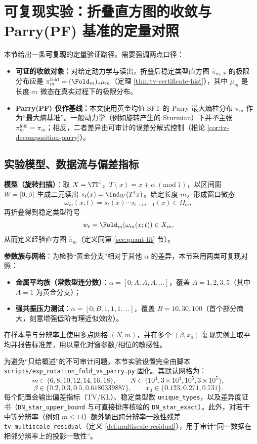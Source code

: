 \section{可复现实验：折叠直方图的收敛与 Parry(PF) 基准的定量对照}\label{sec:experiments}

本节给出一条\textbf{可复现}的定量验证路径。需要强调两点口径：
\begin{itemize}
  \item \textbf{可证的收敛对象：}对给定动力学与读出，折叠后稳定类型直方图 $\hat{\pi}_{m,N}$ 的极限分布应是 $\pi_m^{\mathrm{fold}}=(\Fold_m)_*\mu_m$（定理 \ref{thm:tv-certificate-hist}），其中 $\mu_m$ 是长度-$m$ 微态在真实过程下的极限分布。
  \item \textbf{Parry(PF) 仅作基线：}本文使用黄金均值 SFT 的 Parry 最大熵柱分布 $\pi_m$ 作为“最大熵基准”。一般动力学（例如旋转产生的 Sturmian）下并\emph{不}主张 $\pi_m^{\mathrm{fold}}=\pi_m$；相反，二者差异由可审计的误差分解式控制（推论 \ref{cor:tv-decomposition-parry}）。
\end{itemize}

\subsection{实验模型、数据流与偏差指标}

\textbf{模型（旋转扫描）}：取 $X=\TT^1$，$T(x)=x+\alpha\ (\mathrm{mod}\ 1)$，以区间窗 $W=[0,\beta)$ 生成二元读出 $s_t(x)=\ind_W(T^t x)$。给定长度 $m$，形成窗口微态
\[
\omega_m(x;t)=s_t(x)\cdots s_{t+m-1}(x)\in\Omega_m,
\]
再折叠得到稳定类型符号
\[
w_t=\Fold_m(\omega_m(x;t))\in X_m,
\]
从而定义经验直方图 $\hat{\pi}_m$（定义同第 \ref{sec:quant-fit} 节）。

\textbf{参数族与网格}：为检验“黄金分支”相对于其他 $\alpha$ 的差异，本节采用两类可复现对照：
\begin{itemize}
  \item \textbf{金属平均族（常数型连分数）}：$\alpha=[0;A,A,A,\dots]$，覆盖 $A=1,2,3,5$（其中 $A=1$ 为黄金分支）；
  \item \textbf{强共振压力测试}：$\alpha=[0;B,1,1,1,\dots]$，覆盖 $B=10,30,100$（首个部分商大，刻意增强低阶有理近似效应）。
\end{itemize}
在样本量与分辨率上使用多点网格 $(N,m)$，并在多个 $(\beta,x_0)$ 复现实例上取平均并报告标准差，用以量化对窗参数/相位的敏感性。

\begin{remark}[数据与方案的脚本精确口径]\label{rem:exp-script-spec}
为避免“只给概述”的不可审计问题，本节实验设置完全由脚本 \verb|scripts/exp_rotation_fold_vs_parry.py| 固化。其默认网格为：
\[
m\in\{6,8,10,12,14,16,18\},\qquad
N\in\{10^4,3\times 10^4,10^5,3\times 10^5\},
\]
\[
\beta\in\{0.2,0.3,0.5,0.6180339887\},\qquad
x_0\in\{0.123,0.271,0.731\}.
\]
每个配置会输出偏差指标（TV/KL）、稳定类型数 \texttt{unique\_types}，以及差异度证书（\texttt{DN\_star\_upper\_bound} 与可直接排序核验的 \texttt{DN\_star\_exact}）。此外，对若干中等分辨率（例如 $m\le 14$）额外输出跨分辨率一致性残差 \texttt{tv\_multiscale\_residual}（定义 \ref{def:multiscale-residual}），用于审计“同一数据在相邻分辨率上的投影一致性”。
\end{remark}

